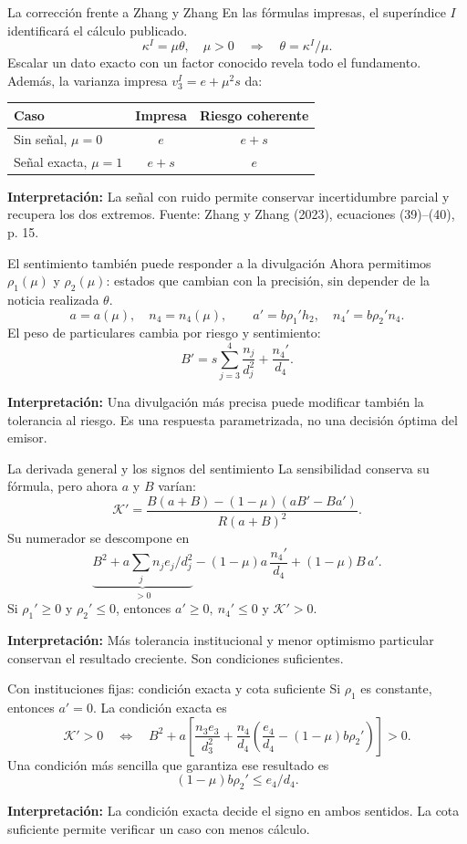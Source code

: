 \documentclass[aspectratio=169,11pt]{beamer}
\newcommand{\K}{\mathcal K}
\newcommand{\idea}[1]{\par\medskip\textbf{Interpretación:} #1}
\begin{document}
\begin{frame}{La corrección frente a Zhang y Zhang}
\small
En las fórmulas impresas, el superíndice \(I\) identificará el cálculo publicado.
\[
\kappa^{I}=\mu\theta,\quad \mu>0
\quad\Longrightarrow\quad \theta=\kappa^{I}/\mu.
\]
Escalar un dato exacto con un factor conocido revela todo el fundamento.
Además, la varianza impresa \(v_3^{I}=e+\mu^2s\) da:
\begin{center}
\begin{tabular}{lcc}
\toprule
Caso & Impresa & Riesgo coherente\\
\midrule
Sin señal, \(\mu=0\) & \(e\) & \(e+s\)\\
Señal exacta, \(\mu=1\) & \(e+s\) & \(e\)\\
\bottomrule
\end{tabular}
\end{center}
\normalsize
\idea{La señal con ruido permite conservar incertidumbre parcial y
recupera los dos extremos.}
\small Fuente: Zhang y Zhang (2023), ecuaciones (39)--(40), p. 15.
\end{frame}

\begin{frame}{El sentimiento también puede responder a la divulgación}
Ahora permitimos \(\rho_1(\mu)\) y \(\rho_2(\mu)\): estados que cambian
con la precisión, sin depender de la noticia realizada \(\theta\).
\[
a=a(\mu),\quad n_4=n_4(\mu),\qquad
a'=b\rho_1'h_2,\quad n_4'=b\rho_2'n_4.
\]
El peso de particulares cambia por riesgo y sentimiento:
\[
B'=s\sum_{j=3}^4\frac{n_j}{d_j^2}+\frac{n_4'}{d_4}.
\]
\idea{Una divulgación más precisa puede modificar también la tolerancia
al riesgo. Es una respuesta parametrizada, no una decisión óptima del emisor.}
\end{frame}

\begin{frame}{La derivada general y los signos del sentimiento}
\small
La sensibilidad conserva su fórmula, pero ahora \(a\) y \(B\) varían:
\[
\K'=\frac{B(a+B)-(1-\mu)(aB'-Ba')}{R(a+B)^2}.
\]
Su numerador se descompone en
\[
\underbrace{B^2+a\sum_j n_je_j/d_j^2}_{>0}
 -(1-\mu)a\,\frac{n_4'}{d_4}+(1-\mu)B\,a'.
\]
Si \(\rho_1'\geq0\) y \(\rho_2'\leq0\), entonces
\(a'\geq0,\ n_4'\leq0\) y \(\K'>0\).
\normalsize
\idea{Más tolerancia institucional y menor optimismo particular
conservan el resultado creciente. Son condiciones suficientes.}
\end{frame}

\begin{frame}{Con instituciones fijas: condición exacta y cota suficiente}
Si \(\rho_1\) es constante, entonces \(a'=0\). La condición exacta es
\[
\K'>0\quad\Longleftrightarrow\quad
B^2+a\left[
\frac{n_3e_3}{d_3^2}+
\frac{n_4}{d_4}\left(\frac{e_4}{d_4}-(1-\mu)b\rho_2'\right)
\right]>0.
\]
Una condición más sencilla que garantiza ese resultado es
\[
(1-\mu)b\rho_2'\leq e_4/d_4.
\]
\idea{La condición exacta decide el signo en ambos sentidos.
La cota suficiente permite verificar un caso con menos cálculo.}
\end{frame}
\end{document}
